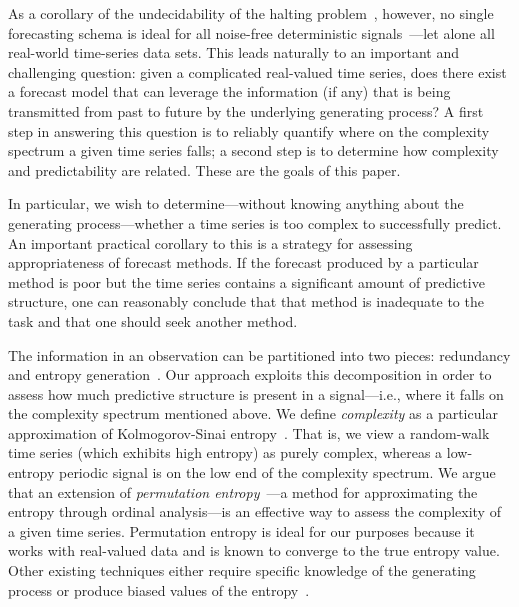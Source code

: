 As a corollary of the undecidability of the halting
problem~\cite{halting-problem}, however, no single forecasting schema
is ideal for all noise-free deterministic
signals~\cite{weigend-book}---let alone all real-world time-series
data sets.  This leads naturally to an important and challenging
question: given a complicated real-valued time series, does there
exist a forecast model that can leverage the information (if any) that
is being transmitted from past to future by the underlying generating
process?  A first step in answering this question is to reliably
quantify where on the complexity spectrum a given time series falls; a
second step is to determine how complexity and predictability are
related.  These are the goals of this paper.

In particular, we wish to determine---without knowing anything about
the generating process---whether a time series is too complex to successfully
predict.  An important practical corollary to this is a strategy for
assessing appropriateness of forecast methods.  If the forecast
produced by a particular method is poor but the time series contains a
significant amount of predictive structure, one can reasonably conclude that that method is inadequate
to the task and that one should seek another method.    

The information in an observation can be partitioned into two pieces:
redundancy and entropy generation~\cite{crutchfield2003}.  
\label{page:redundancy}
Our approach exploits this decomposition in order to assess how much
predictive structure is present in a signal---i.e., where it falls on
the complexity spectrum mentioned above.  We define \emph{complexity}
as a particular approximation of Kolmogorov-Sinai
entropy~\cite{lind95}.  That is, we view a random-walk time series
(which exhibits high entropy) as purely complex, whereas a low-entropy
periodic signal is on the low end of the complexity spectrum.  We
argue that an extension of \emph{permutation
  entropy}~\cite{bandt2002per}---a method for approximating the
entropy through ordinal analysis---is an effective way to assess the
complexity of a given time series.  Permutation entropy is ideal for
our purposes because it works with real-valued data and is known to
converge to the true entropy value. Other existing techniques either
require specific knowledge of the generating process or produce biased
values of the entropy~\cite{bollt2001}.

